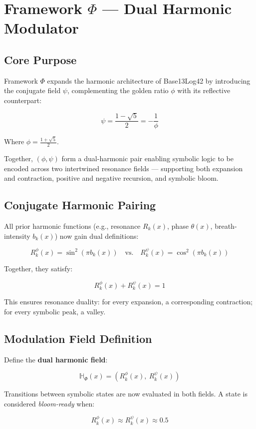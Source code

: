 \section*{Framework $\Phi$ — Dual Harmonic Modulator}

\subsection*{Core Purpose}

Framework $\Phi$ expands the harmonic architecture of Base13Log42 by introducing the conjugate field $\psi$, complementing the golden ratio $\phi$ with its reflective counterpart:

\[
\psi = \frac{1 - \sqrt{5}}{2} = -\frac{1}{\phi}
\]

Where $\phi = \frac{1 + \sqrt{5}}{2}$.

Together, $(\phi, \psi)$ form a dual-harmonic pair enabling symbolic logic to be encoded across two intertwined resonance fields — supporting both expansion and contraction, positive and negative recursion, and symbolic bloom.

\subsection*{Conjugate Harmonic Pairing}

All prior harmonic functions (e.g., resonance $R_k(x)$, phase $\theta(x)$, breath-intensity $b_k(x)$) now gain dual definitions:

\[
R^\phi_k(x) = \sin^2(\pi b_k(x))
\quad \text{vs.} \quad
R^\psi_k(x) = \cos^2(\pi b_k(x))
\]

Together, they satisfy:

\[
R^\phi_k(x) + R^\psi_k(x) = 1
\]

This ensures resonance duality: for every expansion, a corresponding contraction; for every symbolic peak, a valley.

\subsection*{Modulation Field Definition}

Define the \textbf{dual harmonic field}:

\[
\mathbb{H}_\Phi(x) = \left( R^\phi_k(x),\ R^\psi_k(x) \right)
\]

Transitions between symbolic states are now evaluated in both fields. A state is considered \emph{bloom-ready} when:

\[
R^\phi_k(x) \approx R^\psi_k(x) \approx 0.5
\]

